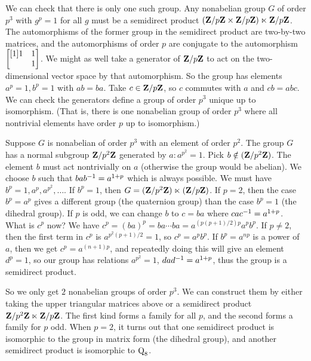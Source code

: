 \documentclass[11pt, oneside]{amsart}
\begin{document}
We can check that there is only one such group. Any nonabelian group $G$ of order $p^3$ with $g^p = 1$ for all $g$ must be a semidirect product $(\mathbf Z / p\mathbf Z \times \mathbf Z / p\mathbf Z)\ltimes \mathbf Z / p\mathbf Z$. The automorphisms of the former group in the semidirect product are two-by-two matrices, and the automorphisms of order $p$ are conjugate to the automorphism $\begin{bmatrix} [1] 1 & 1 \\ &1\end{bmatrix}$. We might as well take a generator of $\mathbf Z / p\mathbf Z$ to act on the two-dimensional vector space by that automorphism. So the group has elements $a^p=1, b^p =1$ with $ab=ba$. Take $c \in \mathbf Z / p\mathbf Z$, so $c$ commutes with $a$ and $cb = abc$. We can check the generators define a group of order $p^3$ unique up to isomorphism. (That is, there is one nonabelian group of order $p^3$ where all nontrivial elements have order $p$ up to isomorphism.)

Suppose $G$ is nonabelian of order $p^3$ with an element of order $p^2$. The group $G$ has a normal subgroup $\mathbf Z / p^2\mathbf Z $ generated by $a : a^{p^2}= 1$. Pick $b \notin (\mathbf Z / p^2\mathbf Z)$. The element $b$ must act nontrivially on $a$ (otherwise the group would be abelian). We choose $b$ such that $bab^{-1} = a^{1+p}$ which is always possible. We must have $b^p=1,a^p,a^{p^2},\hdots$. If $b^p=1$, then $G = (\mathbf Z / p^2\mathbf Z)\ltimes (\mathbf Z / p\mathbf Z)$. If $p=2$, then the case $b^p = a^p $ gives a different group (the quaternion group) than the case $b^p = 1 $ (the dihedral group). If $p$ is odd, we can change $b$ to $c=ba$ where $cac^{-1} = a^{1+p}$. What is $c^p$ now? We have $c^p = (ba)^p = ba\cdots ba = a^{(p(p+1)/2)p}a^pb^p$. If $p\ne 2$, then the first term in $c^p$ is $a^{p^2(p+1)/2} = 1$, so $c^p = a^pb^p$. If $b^p = a^{np}$ is a power of $a$, then we get $c^p = a^{(n+1)p}$, and repeatedly doing this will give an element $d^{p} = 1$, so our group has relations $a^{p^2} = 1$, $dad^{-1} = a^{1+p}$, thus the group is a semidirect product.

So we only get $2$ nonabelian groups of order $p^3$. We can construct them by either taking the upper triangular matrices above or a semidirect product $\mathbf Z / p^2\mathbf Z \ltimes \mathbf Z / p\mathbf Z$. The first kind forms a family for all $p$, and the second forms a family for $p$ odd. When $p=2$, it turns out that one semidirect product is isomorphic to the group in matrix form (the dihedral group), and another semidirect product is isomorphic to $\operatorname{Q}_8$. 
\end{document}

